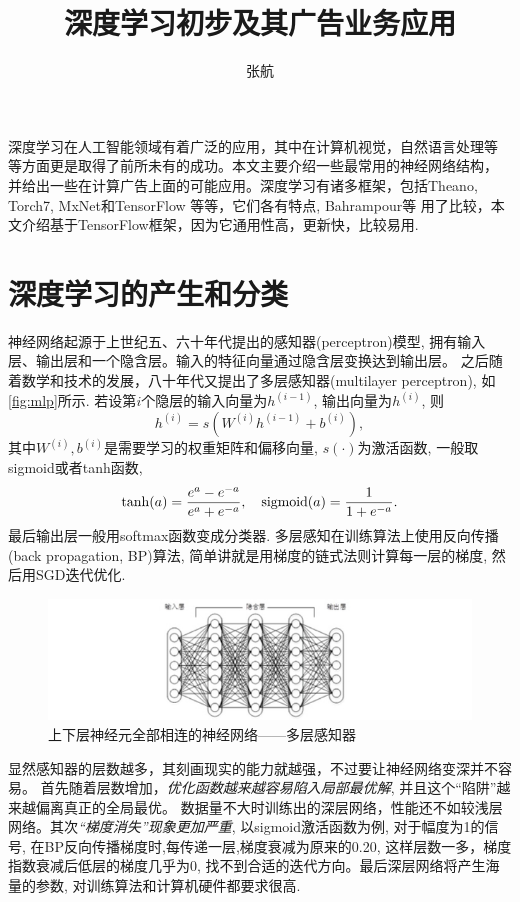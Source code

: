 \documentclass{ctexart}
\title{深度学习初步及其广告业务应用}
\author{张航}
\begin{document}
\lstset{language=Python} 

\maketitle
深度学习在人工智能领域有着广泛的应用，其中在计算机视觉，自然语言处理等
等方面更是取得了前所未有的成功。本文主要介绍一些最常用的神经网络结构，
并给出一些在计算广告上面的可能应用。深度学习有诸多框架，包括Theano, Torch7,
MxNet和TensorFlow 等等，它们各有特点, Bahrampour等 \cite{bahrampour2015comparative}
用了比较，本文介绍基于TensorFlow框架，因为它通用性高，更新快，比较易用.

\section{深度学习的产生和分类}
神经网络起源于上世纪五、六十年代提出的感知器(perceptron)模型, 拥有输入层、输出层和一个隐含层。输入的特征向量通过隐含层变换达到输出层。
之后随着数学和技术的发展，八十年代又提出了多层感知器(multilayer perceptron),
如\autoref{fig:mlp}所示. 若设第\(i\)个隐层的输入向量为\(h^{(i-1)}\),
输出向量为\(h^{(i)}\), 则
\[
  h^{(i)} = s(W^{(i)}h^{(i-1)}+b^{(i)}),
\]
其中\(W^{(i)},b^{(i)}\)是需要学习的权重矩阵和偏移向量, \(s(\cdot)\)为激活函数, 一般取sigmoid或者tanh函数,
\[
  \tanh(a)=\frac{e^a-e^{-a}}{e^a+e^{-a}},\quad \operatorname*{sigmoid}(a)=\frac{1}{1+e^{-a}}.
\]
最后输出层一般用softmax函数变成分类器. 
多层感知在训练算法上使用反向传播(back propagation, BP)算法,
简单讲就是用梯度的链式法则计算每一层的梯度, 然后用SGD迭代优化.
\begin{figure}[htb]
  \centering
  \includegraphics[width=\textwidth]{mlp}
  \caption{上下层神经元全部相连的神经网络——多层感知器}
  \label{fig:mlp}
\end{figure}

显然感知器的层数越多，其刻画现实的能力就越强，不过要让神经网络变深并不容易。
首先随着层数增加，\emph{优化函数越来越容易陷入局部最优解}, 并且这个“陷阱”越来越偏离真正的全局最优。
数据量不大时训练出的深层网络，性能还不如较浅层网络。其次\emph{“梯度消失”现象更加严重},
以sigmoid激活函数为例, 对于幅度为1的信号, 在BP反向传播梯度时,每传递一层,梯度衰减为原来的0.20,
这样层数一多，梯度指数衰减后低层的梯度几乎为0,
找不到合适的迭代方向。最后深层网络将产生海量的参数,
对训练算法和计算机硬件都要求很高.
\end{document}
